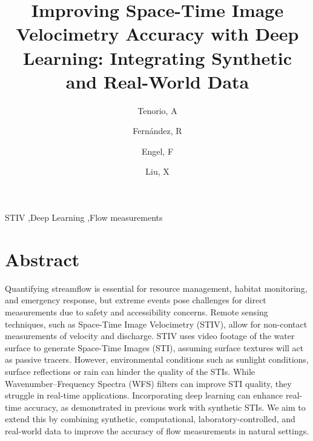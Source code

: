 \documentclass[12pt]{elsarticle}
\begin{document}
\begin{frontmatter}


\title{Improving Space-Time Image Velocimetry Accuracy with Deep Learning: Integrating Synthetic and Real-World Data}

\author[inst1]{Tenorio, A}
\author[inst1]{Fernández, R}
\author[inst2]{Engel, F}
\author[inst1]{Liu, X}



\begin{keyword}
STIV \sep Deep Learning \sep Flow measurements
\end{keyword}

\end{frontmatter}

\linenumbers
\section*{Abstract}
Quantifying streamflow is essential for resource management, habitat monitoring, and emergency response, but extreme events pose challenges for direct measurements due to safety and accessibility concerns. Remote sensing techniques, such as Space-Time Image Velocimetry (STIV), allow for non-contact measurements of velocity and discharge. STIV uses video footage of the water surface to generate Space-Time Images (STI), assuming surface textures will act as passive tracers. However, environmental conditions such as sunlight conditions, surface reflections or rain can hinder the quality of the STIs. While Wavenumber–Frequency Spectra (WFS) filters can improve STI quality, they struggle in real-time applications. Incorporating deep learning can enhance real-time accuracy, as demonstrated in previous work with synthetic STIs. We aim to extend this by combining synthetic, computational, laboratory-controlled, and real-world data to improve the accuracy of flow measurements in natural settings.
\end{document}
